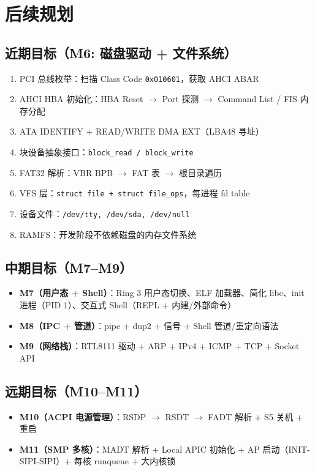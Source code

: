 \documentclass[12pt,a4paper]{article}
\begin{document}
\section{后续规划}

\subsection{近期目标（M6: 磁盘驱动 + 文件系统）}

\begin{enumerate}
    \item PCI 总线枚举：扫描 Class Code \texttt{0x010601}，获取 AHCI ABAR
    \item AHCI HBA 初始化：HBA Reset $\to$ Port 探测 $\to$ Command List / FIS 内存分配
    \item ATA IDENTIFY + READ/WRITE DMA EXT（LBA48 寻址）
    \item 块设备抽象接口：\texttt{block\_read / block\_write}
    \item FAT32 解析：VBR BPB $\to$ FAT 表 $\to$ 根目录遍历
    \item VFS 层：\texttt{struct file + struct file\_ops}，每进程 fd table
    \item 设备文件：\texttt{/dev/tty, /dev/sda, /dev/null}
    \item RAMFS：开发阶段不依赖磁盘的内存文件系统
\end{enumerate}

\subsection{中期目标（M7--M9）}

\begin{itemize}
    \item \textbf{M7（用户态 + Shell）}：Ring 3 用户态切换、ELF 加载器、简化 libc、init 进程（PID 1）、交互式 Shell（REPL + 内建/外部命令）
    \item \textbf{M8（IPC + 管道）}：pipe + dup2 + 信号 + Shell 管道/重定向语法
    \item \textbf{M9（网络栈）}：RTL8111 驱动 + ARP + IPv4 + ICMP + TCP + Socket API
\end{itemize}

\subsection{远期目标（M10--M11）}

\begin{itemize}
    \item \textbf{M10（ACPI 电源管理）}：RSDP $\to$ RSDT $\to$ FADT 解析 + S5 关机 + 重启
    \item \textbf{M11（SMP 多核）}：MADT 解析 + Local APIC 初始化 + AP 启动（INIT-SIPI-SIPI）+ 每核 runqueue + 大内核锁
\end{itemize}
\end{document}
